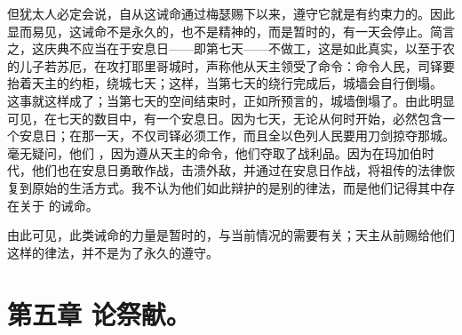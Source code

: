 但犹太人必定会说，自从这诫命通过梅瑟赐下以来，遵守它就是有约束力的。因此显而易见，这诫命不是永久的，也不是精神的，而是暂时的，有一天会停止。简言之，这庆典不应当在于安息日——即第七天——不做工，这是如此真实，以至于农的儿子若苏厄，在攻打耶里哥城时，声称他从天主领受了命令：命令人民，司铎要抬着天主的约柜，绕城七天；这样，当第七天的绕行完成后，城墙会自行倒塌。 这事就这样成了；当第七天的空间结束时，正如所预言的，城墙倒塌了。由此明显可见，在七天的数目中，有一个安息日。因为七天，无论从何时开始，必然包含一个安息日；在那一天，不仅司铎必须工作，而且全以色列人民要用刀剑掠夺那城。毫无疑问，他们 ，因为遵从天主的命令，他们夺取了战利品。因为在玛加伯时代，他们也在安息日勇敢作战，击溃外敌，并通过在安息日作战，将祖传的法律恢复到原始的生活方式。我不认为他们如此辩护的是别的律法，而是他们记得其中存在关于  的诫命。\par

由此可见，此类诫命的力量是暂时的，与当前情况的需要有关；天主从前赐给他们这样的律法，并不是为了永久的遵守。\par


\section{第五章 论祭献。}

